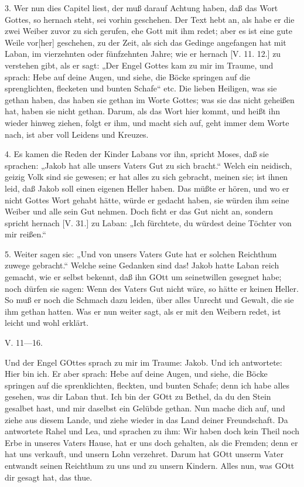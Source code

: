 3. Wer nun dies Capitel liest, der muß darauf Achtung haben, daß das Wort Gottes, so hernach steht, sei vorhin geschehen. Der Text hebt an, als habe er die zwei Weiber zuvor zu sich gerufen, ehe Gott mit ihm redet; aber es ist eine gute Weile vor[her] geschehen, zu der Zeit, als sich das Gedinge angefangen hat mit Laban, im vierzehnten oder fünfzehnten Jahre; wie er hernach [V. 11. 12.] zu verstehen gibt, als er sagt: „Der Engel Gottes kam zu mir im Traume, und sprach: Hebe auf deine Augen, und siehe, die Böcke springen auf die sprenglichten, flecketen und bunten Schafe“ etc. Die lieben Heiligen, was sie gethan haben, das haben sie gethan im Worte Gottes; was sie das nicht geheißen hat, haben sie nicht gethan. Darum, als das Wort hier kommt, und heißt ihn wieder hinweg ziehen, folgt er ihm, und macht sich auf, geht immer dem Worte nach, ist aber voll Leidens und Kreuzes.

4. Es kamen die Reden der Kinder Labans vor ihn, spricht Moses, daß sie sprachen: „Jakob hat alle unsers Vaters Gut zu sich bracht.“ Welch ein neidisch, geizig Volk sind sie gewesen; er hat alles zu sich gebracht, meinen sie; ist ihnen leid, daß Jakob soll einen eigenen Heller haben. Das müßte er hören, und wo er nicht Gottes Wort gehabt hätte, würde er gedacht haben, sie würden ihm seine Weiber und alle sein Gut nehmen. Doch ficht er das Gut nicht an, sondern spricht hernach [V. 31.] zu Laban: „Ich fürchtete, du würdest deine Töchter von mir reißen.“

5. Weiter sagen sie: „Und von unsers Vaters
Gute hat er solchen Reichthum zuwege gebracht.“ Welche seine Gedanken sind das! Jakob hatte Laban reich gemacht, wie er selbst bekennt, daß ihn GOtt um seinetwillen gesegnet habe; noch dürfen sie sagen: Wenn des Vaters Gut nicht wäre, so hätte er keinen Heller. So muß er noch die Schmach dazu leiden, über alles Unrecht und Gewalt, die sie ihm gethan hatten. Was er nun weiter sagt, als er mit den Weibern redet, ist leicht und wohl erklärt.

V. 11—16.

Und der Engel GOttes sprach zu mir im Traume: Jakob. Und ich antwortete: Hier bin ich. Er aber sprach: Hebe auf deine Augen, und siehe, die Böcke springen auf die sprenklichten, fleckten, und bunten Schafe; denn ich habe alles gesehen, was dir Laban thut. Ich bin der GOtt zu Bethel, da du den Stein gesalbet hast, und mir daselbst ein Gelübde gethan. Nun mache dich auf, und ziehe aus diesem Lande, und ziehe wieder in das Land deiner Freundschaft. Da antwortete Rahel und Lea, und sprachen zu ihm: Wir haben doch kein Theil noch Erbe in unseres Vaters Hause, hat er uns doch gehalten, als die Fremden; denn er hat uns verkauft, und unsern Lohn verzehret. Darum hat GOtt unserm Vater entwandt seinen Reichthum zu uns und zu unsern Kindern. Alles nun, was GOtt dir gesagt hat, das thue.

